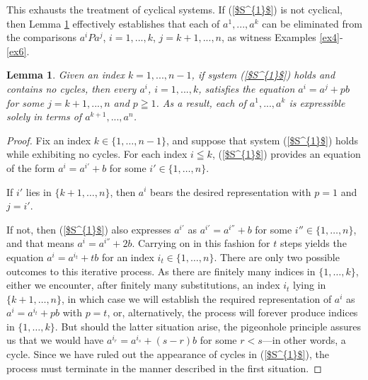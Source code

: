 \documentclass[pdflatex,sn-apa,11pt]{sn-jnl}%
\newtheorem{lemma}{Lemma}
\begin{document}
This exhausts the treatment of cyclical systems. If (\ref{$S^{1}$}) is not cyclical, then Lemma \ref{prop2} effectively establishes that each of $a^1, ..., a^k$ can be eliminated from the comparisons $a^{i}Pa^{j}$, $i = 1, ..., k$, $j = k+1, ..., n$, as witness Examples \ref{ex4}-\ref{ex6}. 

\begin{lemma}
\label{prop2}
Given an index $k = 1, ..., n-1$, if system (\ref{$S^{1}$}) holds and contains no cycles, then every $a^i$, $i = 1, ..., k$, satisfies the equation $a^i = a^j + pb$ for some $j = k+1, ..., n$ and $p \geqq 1$. As a result, each of $a^1, ..., a^{k}$ is expressible solely in terms of $a^{k+1}, ..., a^{n}$.
\end{lemma}

\begin{proof}
Fix an index $k \in \{1, \dots, n-1\}$, and suppose that system (\ref{$S^{1}$}) holds while exhibiting no cycles. For each index $i \leqq k$, (\ref{$S^{1}$}) provides an equation of the form $a^i = a^{i'} + b$ for some $i' \in \{1, \dots, n\}$.

If $i'$ lies in $\{k+1, \dots, n\}$, then $a^i$ bears the desired representation with $p = 1$ and $j = i'$.

If not, then (\ref{$S^{1}$}) also expresses $a^{i'}$ as $a^{i'} = a^{i''} + b$ for some $i'' \in \{1, \dots, n\}$, and that means $a^i = a^{i''} + 2b$. Carrying on in this fashion for $t$ steps yields the equation $a^i = a^{i_t} + tb$ for an index $i_t \in \{1, \dots, n\}$. There are only two possible outcomes to this iterative process. As there are finitely many indices in $\{1, \dots, k\}$, either we encounter, after finitely many substitutions, an index $i_t$ lying in $\{k+1, \dots, n\}$, in which case we will establish the required representation of $a^i$ as $a^i = a^{i_t} + pb$ with $p = t$, or, alternatively, the process will forever produce indices in $\{1, \dots, k\}$. But should the latter situation arise, the pigeonhole principle assures us that we would have $a^{i_r} = a^{i_s} + (s-r)b$ for some $r < s$---in other words, a cycle. Since we have ruled out the appearance of cycles in (\ref{$S^{1}$}), the process must terminate in the manner described in the first situation.     

\end{proof}
\end{document}
